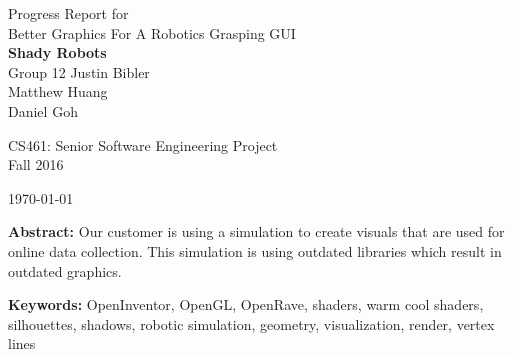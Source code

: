 \documentclass[10pt,journal,compsoc,draftclsnofoot]{IEEEtran}
\begin{document}
\onecolumn

\begin{titlepage}
\null
\vspace{15mm}

\begin{flushleft}
\begin{bfseries}
	\vskip2mm
	\Huge{Progress Report for\\ Better Graphics For A Robotics Grasping GUI}\\
	\vspace{15mm}
	\textbf{\huge Shady Robots} \\
	\vskip2mm
	\large{Group 12}
	\vskip5mm
	\Large{Justin Bibler \\
	Matthew Huang \\
	Daniel Goh \\}
\end{bfseries}

\vspace{15mm}
\Large{CS461: Senior Software Engineering Project} \\
\Large{Fall 2016} \\

\vspace{5mm}

\today

\vfill

\begin{normalsize}
{\bf Abstract:}
Our customer is using a simulation to create visuals that are used for online data collection.
This simulation is using outdated libraries which result in outdated graphics.


{\bf Keywords:} OpenInventor, OpenGL, OpenRave, shaders, warm cool shaders, silhouettes, shadows, robotic simulation, geometry, visualization, render, vertex lines
\end{normalsize}
\end{flushleft}

\newpage

\end{titlepage}
\end{document}
